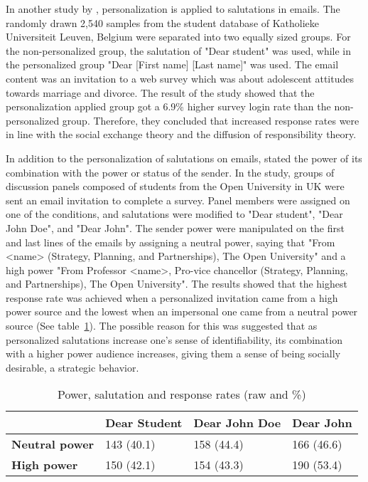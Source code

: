 In another study by \cite{Heerwegh2005}, personalization is applied to salutations in emails. The randomly drawn 2,540 samples from the student database of Katholieke Universiteit Leuven, Belgium were separated into two equally sized groups. For the non-personalized group, the salutation of "Dear student" was used, while in the personalized group "Dear [First name] [Last name]" was used. The email content was an invitation to a web survey which was about adolescent attitudes towards marriage and divorce. The result of the study showed that the personalization applied group got a 6.9\% higher survey login rate than the non-personalized group. Therefore, they concluded that increased response rates were in line with the social exchange theory and the diffusion of responsibility theory.
\vspace{1cm}

In addition to the personalization of salutations on emails, \cite{Joinson2007} stated the power of its combination with the power or status of the sender. In the study, groups of discussion panels composed of students from the Open University in UK were sent an email invitation to complete a survey. Panel members were assigned on one of the conditions, and salutations were modified to "Dear student", "Dear John Doe", and "Dear John". The sender power were manipulated on the first and last lines of the emails by assigning a neutral power, saying that "From <name> (Strategy, Planning, and Partnerships), The Open University" and a high power "From Professor <name>, Pro-vice chancellor (Strategy, Planning, and Partnerships), The Open University". The results showed that the highest response rate was achieved when a personalized invitation came from a high power source and the lowest when an impersonal one came from a neutral power source (See table~\ref{tab:pow_sal_res}). The possible reason for this was suggested that as personalized salutations increase one's sense of identifiability, its combination with a higher power audience increases, giving them a sense of being socially desirable, a strategic behavior.

\begin{table}[!ht]
\begin{center}
	\caption[Power, salutation and response rates (raw and \%)]{Power, salutation and response rates (raw and \%) \citep{Joinson2007}} \label{tab:pow_sal_res}
    \begin{tabular}{ p{3cm} p{3cm}  p{3cm}  p{3cm} }
	\hline
	& \textbf{Dear Student} & \textbf{Dear John Doe} & \textbf{Dear John} \\ \hline
	\textbf{Neutral power} & 143 (40.1) & 158 (44.4) & 166 (46.6) \\
	\textbf{High power} & 150 (42.1) & 154 (43.3) & 190 (53.4) \\ \hline
    \end{tabular}
\end{center}
\end{table}

